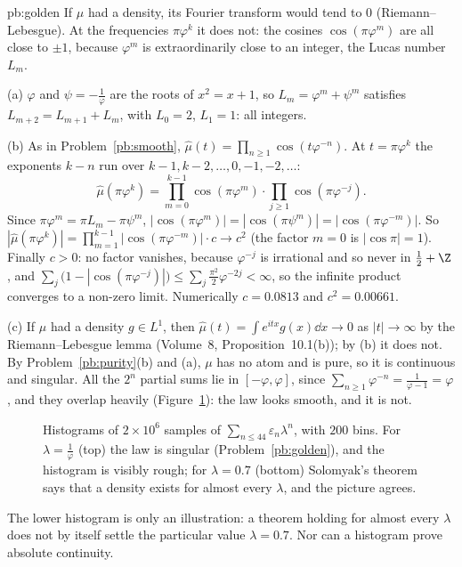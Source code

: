 \begin{solution}{pb:golden}
\idea If $\mu$ had a density, its Fourier transform would tend to $0$ (Riemann--Lebesgue). At the frequencies $\pi\varphi^k$ it does not: the cosines $\cos(\pi\varphi^m)$
are all close to $\pm1$, because $\varphi^m$ is extraordinarily close to an integer, the Lucas number $L_m$.

\writeup (a) $\varphi$ and $\psi=-\frac1\varphi$ are the roots of $x^2=x+1$, so $L_m=\varphi^m+\psi^m$ satisfies $L_{m+2}=L_{m+1}+L_m$, with $L_0=2$, $L_1=1$: all integers.

(b) As in Problem~\ref{pb:smooth}, $\hat\mu(t)=\prod_{n\ge1}\cos(t\varphi^{-n})$. At $t=\pi\varphi^k$ the exponents $k-n$ run over $k-1,k-2,\dots,0,-1,-2,\dots$:
\[
\hat\mu(\pi\varphi^k)=\prod_{m=0}^{k-1}\cos(\pi\varphi^m)\cdot\prod_{j\ge1}\cos(\pi\varphi^{-j}).
\]
Since $\pi\varphi^m=\pi L_m-\pi\psi^m$, $|\cos(\pi\varphi^m)|=|\cos(\pi\psi^m)|=|\cos(\pi\varphi^{-m})|$. So
$|\hat\mu(\pi\varphi^k)|=\prod_{m=1}^{k-1}|\cos(\pi\varphi^{-m})|\cdot c\to c^2$ (the factor $m=0$ is $|\cos\pi|=1$). Finally $c>0$: no factor vanishes, because $\varphi^{-j}$ is
irrational and so never in $\frac12+\Z$, and $\sum_j\bigl(1-|\cos(\pi\varphi^{-j})|\bigr)\le\sum_j\frac{\pi^2}2\varphi^{-2j}<\infty$, so the infinite product converges to a non-zero limit.
Numerically $c=0.0813$ and $c^2=0.00661$.

(c) If $\mu$ had a density $g\in L^1$, then $\hat\mu(t)=\int e^{itx}g(x)\dd x\to0$ as $|t|\to\infty$ by the Riemann--Lebesgue lemma (Volume~8, Proposition~10.1(b)); by (b) it does not.
By Problem~\ref{pb:purity}(b) and (a), $\mu$ has no atom and is pure, so it is continuous and singular. All the $2^n$ partial sums lie in $[-\varphi,\varphi]$, since
$\sum_{n\ge1}\varphi^{-n}=\frac1{\varphi-1}=\varphi$, and they overlap heavily (Figure~\ref{fig:golden}): the law looks smooth, and it is not.

\begin{figure}[ht]
\centering{}
\caption{Histograms of $2\times10^6$ samples of $\sum_{n\le44}\varepsilon_n\lambda^n$, with $200$ bins. For $\lambda=\frac1\varphi$ (top) the law is singular (Problem~\ref{pb:golden}),
and the histogram is visibly rough; for $\lambda=0.7$ (bottom) Solomyak's theorem says that a density exists for almost every $\lambda$, and the picture agrees.}
\label{fig:golden}
\end{figure}

The lower histogram is only an illustration: a theorem holding for almost every $\lambda$ does not by itself settle the particular value $\lambda=0.7$. Nor can a histogram prove absolute continuity.


\end{solution}

